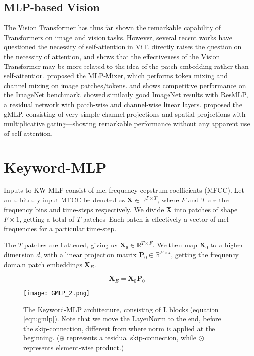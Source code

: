 \documentclass{article} \usepackage{iclr2022_conference,times}
\def\mP{{\bm{P}}}
\def\mX{{\bm{X}}}
\newcommand{\R}{\mathbb{R}}
\begin{document}
\subsection{MLP-based Vision}
The Vision Transformer \citep{dosovitskiy2020image} has thus far shown the remarkable capability of Transformers on image and vision tasks. However, several recent works have questioned the necessity of self-attention in ViT. \citet{melas2021you} directly raises the question on the necessity of attention, and shows that the effectiveness of the Vision Transformer may be more related to the idea of the patch embedding rather than self-attention. \citet{tolstikhin2021mlp} proposed the MLP-Mixer, which performs token mixing and channel mixing on image patches/tokens, and shows competitive performance on the ImageNet benchmark. \citet{touvron2021resmlp} showed similarly good ImageNet results with ResMLP, a residual network with patch-wise and channel-wise linear layers. \citet{liu2021pay} proposed the gMLP, consisting of very simple channel projections and spatial projections with multiplicative gating---showing remarkable performance without any apparent use of self-attention.

\section{Keyword-MLP}
\label{sec:proposed-method}

Inputs to KW-MLP consist of mel-frequency cepstrum coefficients (MFCC). Let an arbitrary input MFCC be denoted as $\mX \in \R^{F\times{T}}$, where $F$ and $T$ are the frequency bins and time-steps respectively. We divide $\mX$ into patches of shape $F\times{1}$, getting a total of $T$ patches. Each patch is effectively a vector of mel-frequencies for a particular time-step. 

The $T$ patches are flattened, giving us $\mX_{0} \in \R^{T \times F}$. We then map $\mX_{0}$ to a higher dimension $d$, with a linear projection matrix $\mP_{0} \in \R^{F \times d}$, getting the frequency domain patch embeddings $\mX_{E}$.

\begin{equation}
    \mX_{E} = \mX_{0}\mP_{0}
\end{equation}

\begin{figure}[ht]
\centering
    \texttt{[image: GMLP\_2.png]}
\caption{The Keyword-MLP architecture, consisting of L blocks (equation \ref{eqn:gmlp}). Note that we move the LayerNorm to the end, before the skip-connection, different from \citet{liu2021pay} where norm is applied at the beginning. ($\oplus$ represents a residual skip-connection, while $\odot$ represents element-wise product.)}

\label{fig:kw-mlp}
\end{figure}
\end{document}
